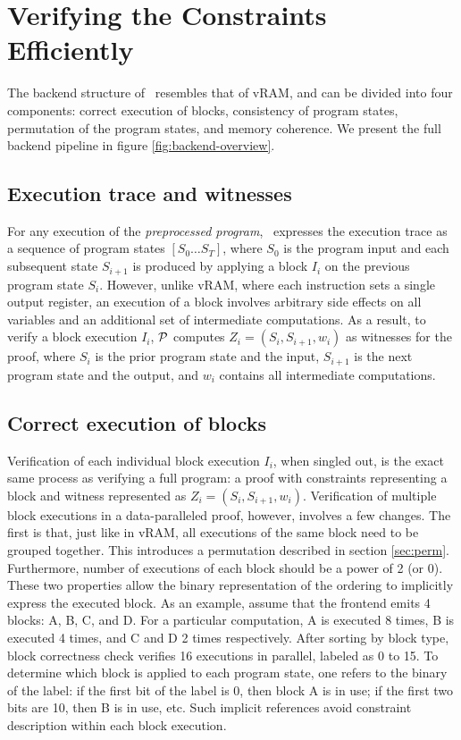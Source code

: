 \section{Verifying the Constraints Efficiently}
The backend structure of \CoBBl~resembles that of vRAM, and can be divided into four components: correct execution of blocks, consistency of program states, permutation of the program states, and memory coherence. We present the full backend pipeline in figure \ref{fig:backend-overview}.



\subsection{Execution trace and witnesses}
For any execution of the \emph{preprocessed program}, \CoBBl~expresses the execution trace as a sequence of program states $[S_0\dots S_T]$, where $S_0$ is the program input and each subsequent state $S_{i+1}$ is produced by applying a block $I_i$ on the previous program state $S_i$. However, unlike vRAM, where each instruction sets a single output register, an execution of a block involves arbitrary side effects on all variables and an additional set of intermediate computations. As a result, to verify a block execution $I_i$, $\P$ computes $Z_i = (S_i, S_{i+1}, w_i)$ as witnesses for the proof, where $S_i$ is the prior program state and the input, $S_{i+1}$ is the next program state and the output, and $w_i$ contains all intermediate computations.

\subsection{Correct execution of blocks} \label{sec:block_correctness}
Verification of each individual block execution $I_i$, when singled out, is the exact same process as verifying a full program: a proof with constraints representing a block and witness represented as $Z_i = (S_i, S_{i+1}, w_i)$. Verification of multiple block executions in a data-paralleled proof, however, involves a few changes. The first is that, just like in vRAM, all executions of the same block need to be grouped together. This introduces a permutation described in section \ref{sec:perm}. Furthermore, number of executions of each block should be a power of 2 (or 0). These two properties allow the binary representation of the ordering to implicitly express the executed block. As an example, assume that the frontend emits 4 blocks: A, B, C, and D. For a particular computation, A is executed 8 times, B is executed 4 times, and C and D 2 times respectively. After sorting by block type, block correctness check verifies 16 executions in parallel, labeled as 0 to 15. To determine which block is applied to each program state, one refers to the binary of the label: if the first bit of the label is 0, then block A is in use; if the first two bits are 10, then B is in use, etc. Such implicit references avoid constraint description within each block execution.

